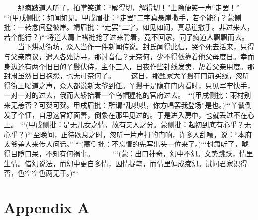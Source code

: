 \documentclass[
    ref = refDemo.bib,
    coverpage = cover.pdf,
    geometry = b5,
    lang = cn
]{spBook}
\begin{document}
    　　那疯跛道人听了，拍掌笑道：“解得切，解得切！”士隐便笑一声“走罢！” ```(甲戌侧批：如闻如见。甲戌眉批：“走罢”二字真悬崖撒手，若个能行？蒙侧批：一转念间登彼岸。靖眉批：“走罢”二字，如见如闻，真悬崖撒手。非过来人，若个能行？)```将道人肩上褡裢抢了过来背着，竟不回家，同了疯道人飘飘而去。  
    　　当下烘动街坊，众人当作一件新闻传说。封氏闻得此信，哭个死去活来，只得与父亲商议，遣人各处访寻，那讨音信？无奈何，少不得依靠着他父母度日。幸而身边还有两个旧日的丫鬟伏侍，主仆三人，日夜作些针线发卖，帮着父亲用度。那封肃虽然日日抱怨，也无可奈何了。  
    　　这日，那甄家大丫鬟在门前买线，忽听得街上喝道之声，众人都说新太爷到任。丫鬟于是隐在门内看时，只见军牢快手，一对一对的过去，俄而大轿抬着一个乌帽猩袍的官府过去。 ```(甲戌侧批：雨村别来无恙否？可贺可贺。甲戌眉批：所谓“乱哄哄，你方唱罢我登场”是也。)```丫鬟倒发了个怔，自思这官好面善，倒象在那里见过的。于是进入房中，也就丢过不在心上。 ```(甲戌侧批：是无儿女之情，故有夫人之分。蒙侧批：起初到底有心乎？无心乎？)```至晚间，正待歇息之时，忽听一片声打的门响，许多人乱嚷，说：“本府太爷差人来传人问话。” ```(蒙侧批：不忘情的先写出头一位来了。)```封肃听了，唬得目瞪口呆，不知有何祸事。  
    　　 ```(蒙：出口神奇，幻中不幻。文势跳跃，情里生情。借幻说法，而幻中更自多情，因情捉笔，而情里偏成痴幻。试问君家识得否，色空空色两无干。)```  

    \backmatter
    \chapter{Appendix A}
    \lipsum[21-30]
\end{document}
